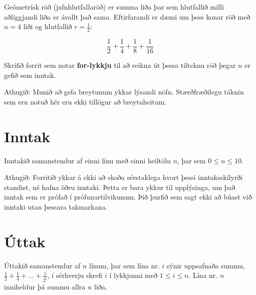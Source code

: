 
\noindent
Geómetrísk röð (jafnhlutfallaröð) er summa liða þar sem hlutfallið milli aðliggjandi liða er ávallt það sama.
Eftirfarandi er dæmi um þess konar röð með $n=4$ liði og hlutfallið $r=\frac{1}{2}$:

\[
\frac{1}{2} + \frac{1}{4} + \frac{1}{8} + \frac{1}{16}
\]

\noindent
Skrifið forrit sem notar \textbf{for-lykkju} til að reikna út þessa tilteknu röð þegar $n$ er gefið sem inntak. \\
\noindent

Athugið: Munið að gefa breytunum ykkar lýsandi nöfn.
Stærðfræðilegu táknin sem eru notuð hér eru ekki tillögur að breytuheitum.

\section*{Inntak}
Inntakið samanstendur af einni línu með einni heiltölu $n$, þar sem $0 \leq n \leq 10$.

Athugið: Forritið ykkar á ekki að skoða sérstaklega hvort þessi inntaksskilyrði standist, né hafna öðru inntaki.
Þetta er bara ykkur til upplýsinga, um það inntak sem er prófað í prófunartilvikunum.
Þið þurfið sem sagt ekki að búast við inntaki utan þessara takmarkana.

\section*{Úttak}
Úttakið samanstendur af $n$ línum, þar sem lína nr. $i$ sýnir uppsafnaða summu,
$\frac{1}{2} + \frac{1}{4} + \dots + \frac{1}{2^i}$, í sérhverju skrefi $i$ í lykkjunni með $1 \leq i \leq n$.
Lína nr. $n$ inniheldur þá summu allra $n$ liða.
